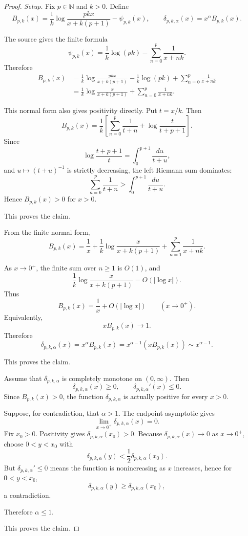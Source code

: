 \documentclass[11pt]{article}
\numberwithin{equation}{section}
\theoremstyle{definition}
\theoremstyle{remark}
\newcommand{\1}{\mathbf 1}
\begin{document}
\begin{proof}
\emph{Setup.}
Fix \(p\in\mathbb N\) and \(k>0\). Define
\[
B_{p,k}(x)=
\frac1k\log\frac{pkx}{x+k(p+1)}-\psi_{p,k}(x),
\qquad
\delta_{p,k,\alpha}(x)=x^\alpha B_{p,k}(x).
\]

The source gives the finite formula
\[
\psi_{p,k}(x)=\frac1k\log(pk)-\sum_{n=0}^p\frac1{x+nk}.
\]
Therefore
\[
\begin{aligned}
B_{p,k}(x)
&=
\frac1k\log\frac{pkx}{x+k(p+1)}
-\frac1k\log(pk)
+\sum_{n=0}^p\frac1{x+nk}  \\
&=
\frac1k\log\frac{x}{x+k(p+1)}
+\sum_{n=0}^p\frac1{x+nk}.
\end{aligned}
\]

This normal form also gives positivity directly. Put \(t=x/k\). Then
\[
B_{p,k}(x)
=\frac1k\left[
\sum_{n=0}^p\frac1{t+n}
+\log\frac{t}{t+p+1}
\right].
\]
Since
\[
\log\frac{t+p+1}{t}=\int_0^{p+1}\frac{du}{t+u},
\]
and \(u\mapsto(t+u)^{-1}\) is strictly decreasing, the left Riemann sum dominates:
\[
\sum_{n=0}^p\frac1{t+n}
>
\int_0^{p+1}\frac{du}{t+u}.
\]
Hence \(B_{p,k}(x)>0\) for \(x>0\).

This proves the claim.

From the finite normal form,
\[
B_{p,k}(x)
=\frac1x
+\frac1k\log\frac{x}{x+k(p+1)}
+\sum_{n=1}^p\frac1{x+nk}.
\]

As \(x\to0^+\), the finite sum over \(n\ge1\) is \(O(1)\), and
\[
\frac1k\log\frac{x}{x+k(p+1)}=O(|\log x|).
\]
Thus
\[
B_{p,k}(x)=\frac1x+O(|\log x|)
\qquad (x\to0^+).
\]
Equivalently,
\[
xB_{p,k}(x)\to1.
\]
Therefore
\[
\delta_{p,k,\alpha}(x)
=x^\alpha B_{p,k}(x)
=x^{\alpha-1}(xB_{p,k}(x))
\sim x^{\alpha-1}.
\]

This proves the claim.

Assume that \(\delta_{p,k,\alpha}\) is completely monotone on \((0,\infty)\). Then
\[
\delta_{p,k,\alpha}(x)\ge0,\qquad
\delta_{p,k,\alpha}'(x)\le0.
\]
Since \(B_{p,k}(x)>0\), the function \(\delta_{p,k,\alpha}\) is actually positive for every \(x>0\).

Suppose, for contradiction, that \(\alpha>1\). The endpoint asymptotic gives
\[
\lim_{x\to0^+}\delta_{p,k,\alpha}(x)=0.
\]
Fix \(x_0>0\). Positivity gives \(\delta_{p,k,\alpha}(x_0)>0\). Because \(\delta_{p,k,\alpha}(x)\to0\) as \(x\to0^+\), choose \(0<y<x_0\) with
\[
\delta_{p,k,\alpha}(y)<\frac12\delta_{p,k,\alpha}(x_0).
\]
But \(\delta_{p,k,\alpha}'\le0\) means the function is nonincreasing as \(x\) increases, hence for \(0<y<x_0\),
\[
\delta_{p,k,\alpha}(y)\ge\delta_{p,k,\alpha}(x_0),
\]
a contradiction.

Therefore \(\alpha\le1\).

This proves the claim.
\end{proof}
\end{document}
